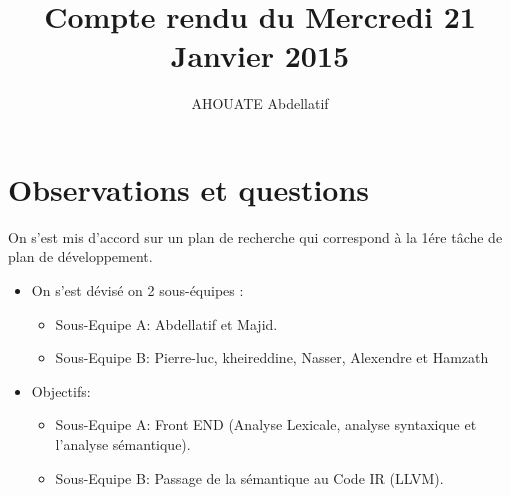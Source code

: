 \documentclass{../../../../../res/rapport}
\author{AHOUATE Abdellatif}
\title{Compte rendu du Mercredi 21 Janvier 2015}
\begin{document}
    \maketitle
    \tableofcontents
    \clearpage
    
    \section{Observations et questions} 
    \label{sec:observations_et_questions}
	On s'est mis d'accord sur un plan de recherche qui correspond à la 1ére tâche de plan de développement.
        \begin{itemize}
            \item  On s'est dévisé on 2 sous-équipes :
		\begin{itemize}
			\item Sous-Equipe A: Abdellatif et Majid.
			\item Sous-Equipe B: Pierre-luc, kheireddine, Nasser, Alexendre et Hamzath		
		\end{itemize}
	    \item Objectifs:
		\begin{itemize}
			\item Sous-Equipe A: Front END (Analyse Lexicale, analyse syntaxique et l'analyse sémantique).
			\item Sous-Equipe B: Passage de la sémantique au Code IR (LLVM).		
		\end{itemize}
        \end{itemize}
        
\end{document}
